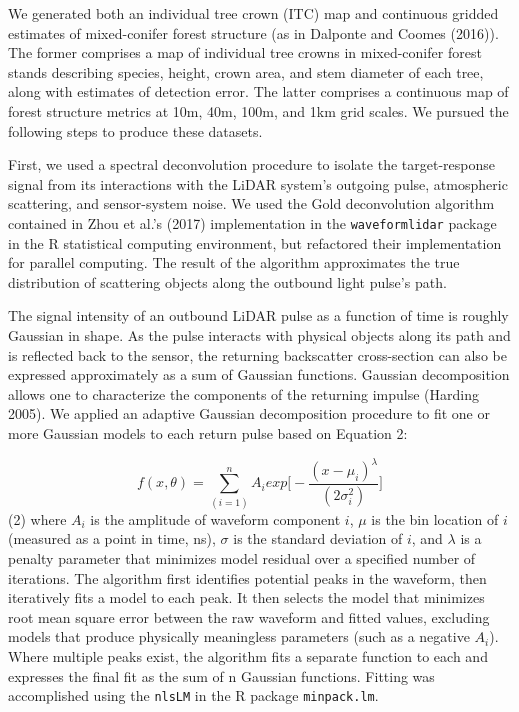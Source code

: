 \documentclass[
  12pt,
]{article}
\begin{document}
We generated both an individual tree crown (ITC) map and continuous
gridded estimates of mixed-conifer forest structure (as in Dalponte and
Coomes (2016)). The former comprises a map of individual tree crowns in
mixed-conifer forest stands describing species, height, crown area, and
stem diameter of each tree, along with estimates of detection error. The
latter comprises a continuous map of forest structure metrics at 10m,
40m, 100m, and 1km grid scales. We pursued the following steps to
produce these datasets.

First, we used a spectral deconvolution procedure to isolate the
target-response signal from its interactions with the LiDAR system's
outgoing pulse, atmospheric scattering, and sensor-system noise. We used
the Gold deconvolution algorithm contained in Zhou et al.'s (2017)
implementation in the \texttt{waveformlidar} package in the R
statistical computing environment, but refactored their implementation
for parallel computing. The result of the algorithm approximates the
true distribution of scattering objects along the outbound light pulse's
path.

The signal intensity of an outbound LiDAR pulse as a function of time is
roughly Gaussian in shape. As the pulse interacts with physical objects
along its path and is reflected back to the sensor, the returning
backscatter cross-section can also be expressed approximately as a sum
of Gaussian functions. Gaussian decomposition allows one to characterize
the components of the returning impulse (Harding 2005). We applied an
adaptive Gaussian decomposition procedure to fit one or more Gaussian
models to each return pulse based on Equation 2:

\[f(x,\theta) = \sum_{(i=1)}^{n} A_i exp\biggl[-\frac{(x-\mu_i)^\lambda}{(2\sigma_i^2)}\biggr]\]
(2) where \(A_i\) is the amplitude of waveform component \(i\), \(\mu\)
is the bin location of \(i\) (measured as a point in time, ns),
\(\sigma\) is the standard deviation of \(i\), and \(\lambda\) is a
penalty parameter that minimizes model residual over a specified number
of iterations. The algorithm first identifies potential peaks in the
waveform, then iteratively fits a model to each peak. It then selects
the model that minimizes root mean square error between the raw waveform
and fitted values, excluding models that produce physically meaningless
parameters (such as a negative \(A_i\)). Where multiple peaks exist, the
algorithm fits a separate function to each and expresses the final fit
as the sum of n Gaussian functions. Fitting was accomplished using the
\texttt{nlsLM} in the R package \texttt{minpack.lm}.
\end{document}
